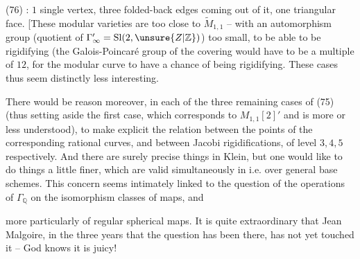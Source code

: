 (76) 
: $1$ single vertex,
three folded-back edges coming out of it, one
triangular face. [These modular varieties are
too close to $\widetilde M_{1,1}$ -- with an automorphism
group (quotient of $\Gamma'_\infty=\mathrm{Sl}(2,\unsure{Z|\mathbb Z})$) too small,
to be able to be rigidifying (the Galois-Poincaré group of the covering
would have to
be a multiple of $12$, for  the modular curve to have a chance of being rigidifying. These
cases thus seem distinctly less interesting.

There would be reason moreover, in each of the
three remaining cases of (75) (thus setting aside the
first case, which corresponds to $M_{1,1}[2]'$ and is
more or less understood), to make explicit the relation
between the points of the corresponding rational curves,
and between  Jacobi rigidifications,
of level $3,4,5$ respectively. And there
are surely precise things in Klein,
but one would like to do things a little
finer, which are valid simultaneously
in  i.e. over general
base schemes. This concern seems intimately linked to the question of the operations of
$\Gamma_{\mathbb Q}$ on the isomorphism classes of maps, and


more particularly of regular
spherical maps. It is quite extraordinary that
Jean Malgoire, in the three years that the
question has been there, has not yet touched it
-- God knows it is juicy!

